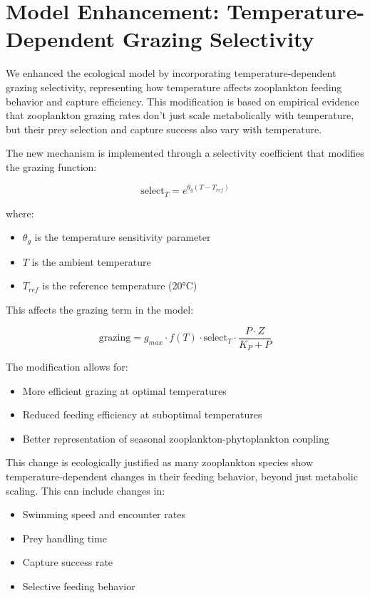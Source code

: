 \section{Model Enhancement: Temperature-Dependent Grazing Selectivity}

We enhanced the ecological model by incorporating temperature-dependent grazing selectivity, representing how temperature affects zooplankton feeding behavior and capture efficiency. This modification is based on empirical evidence that zooplankton grazing rates don't just scale metabolically with temperature, but their prey selection and capture success also vary with temperature.

The new mechanism is implemented through a selectivity coefficient that modifies the grazing function:

\[ \text{select}_T = e^{\theta_g(T - T_{ref})} \]

where:
\begin{itemize}
\item $\theta_g$ is the temperature sensitivity parameter
\item $T$ is the ambient temperature
\item $T_{ref}$ is the reference temperature (20°C)
\end{itemize}

This affects the grazing term in the model:

\[ \text{grazing} = g_{max} \cdot f(T) \cdot \text{select}_T \cdot \frac{P \cdot Z}{K_P + P} \]

The modification allows for:
\begin{itemize}
\item More efficient grazing at optimal temperatures
\item Reduced feeding efficiency at suboptimal temperatures
\item Better representation of seasonal zooplankton-phytoplankton coupling
\end{itemize}

This change is ecologically justified as many zooplankton species show temperature-dependent changes in their feeding behavior, beyond just metabolic scaling. This can include changes in:
\begin{itemize}
\item Swimming speed and encounter rates
\item Prey handling time
\item Capture success rate
\item Selective feeding behavior
\end{itemize}

